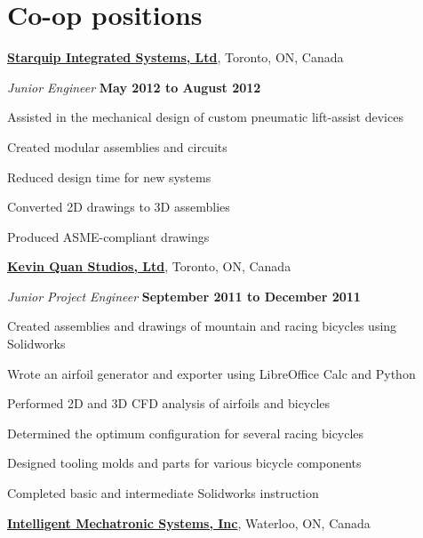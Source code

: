 \documentclass[10pt, a4paper]{article}
\begin{document}
\section{Co-op positions}

\href{http://starquip.com/}{\textbf{Starquip Integrated Systems, Ltd}}, Toronto, ON, Canada

\begin{outerlist}
\item[] \textit{Junior Engineer} \hfill \textbf{May 2012 to August 2012}
\begin{innerlist}
  \item Assisted in the mechanical design of custom pneumatic lift-assist devices
  \item Created modular assemblies and circuits
  \item Reduced design time for new systems
  \item Converted 2D drawings to 3D assemblies
  \item Produced ASME-compliant drawings
\end{innerlist}
\end{outerlist}

\halfblankline

\href{http://www.kqbikes.com/}{\textbf{Kevin Quan Studios, Ltd}}, Toronto, ON, Canada

\begin{outerlist}
\item[] \textit{Junior Project Engineer} \hfill \textbf{September 2011 to December 2011}
\begin{innerlist}
  \item Created assemblies and drawings of mountain and racing bicycles using Solidworks
  \item Wrote an airfoil generator and exporter using LibreOffice Calc and Python
  \item Performed 2D and 3D CFD analysis of airfoils and bicycles
  \item Determined the optimum configuration for several racing bicycles
  \item Designed tooling molds and parts for various bicycle components
  \item Completed basic and intermediate Solidworks instruction
\end{innerlist}
\end{outerlist}

\halfblankline

\href{http://www.intellimec.com/}{\textbf{Intelligent Mechatronic Systems, Inc}}, Waterloo, ON, Canada
\end{document}

